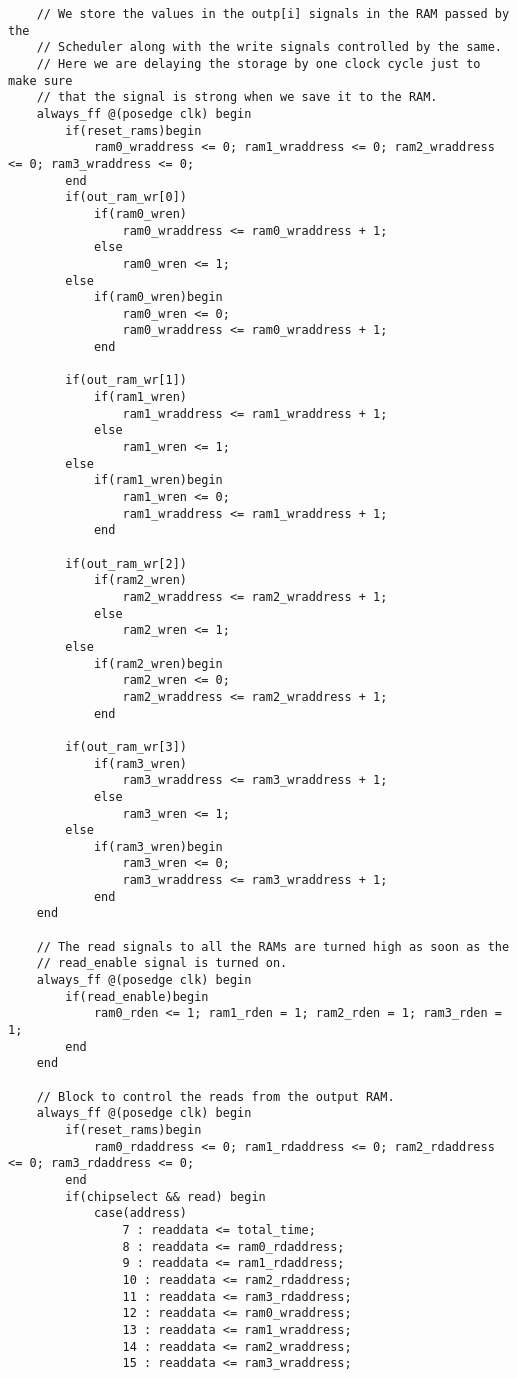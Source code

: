 \documentclass[twoside,12pt,fleqn]{book} %
\begin{document}
\begin{lstlisting}
    // We store the values in the outp[i] signals in the RAM passed by the 
    // Scheduler along with the write signals controlled by the same.
    // Here we are delaying the storage by one clock cycle just to make sure
    // that the signal is strong when we save it to the RAM.
    always_ff @(posedge clk) begin
		if(reset_rams)begin
			ram0_wraddress <= 0; ram1_wraddress <= 0; ram2_wraddress <= 0; ram3_wraddress <= 0;
		end
        if(out_ram_wr[0])
            if(ram0_wren)
                ram0_wraddress <= ram0_wraddress + 1;
            else
                ram0_wren <= 1;
        else
            if(ram0_wren)begin
                ram0_wren <= 0;
                ram0_wraddress <= ram0_wraddress + 1;
            end

        if(out_ram_wr[1])
            if(ram1_wren)
                ram1_wraddress <= ram1_wraddress + 1;
            else
                ram1_wren <= 1;
        else
            if(ram1_wren)begin
                ram1_wren <= 0;
                ram1_wraddress <= ram1_wraddress + 1;
            end

        if(out_ram_wr[2])
            if(ram2_wren)
                ram2_wraddress <= ram2_wraddress + 1;
            else
                ram2_wren <= 1;
        else
            if(ram2_wren)begin
                ram2_wren <= 0;
                ram2_wraddress <= ram2_wraddress + 1;
            end

        if(out_ram_wr[3])
            if(ram3_wren)
                ram3_wraddress <= ram3_wraddress + 1;
            else
                ram3_wren <= 1;
        else
            if(ram3_wren)begin
                ram3_wren <= 0;
                ram3_wraddress <= ram3_wraddress + 1;
            end
    end

    // The read signals to all the RAMs are turned high as soon as the
    // read_enable signal is turned on.
    always_ff @(posedge clk) begin
        if(read_enable)begin
            ram0_rden <= 1; ram1_rden = 1; ram2_rden = 1; ram3_rden = 1;
        end
    end

    // Block to control the reads from the output RAM.
    always_ff @(posedge clk) begin
		if(reset_rams)begin
			ram0_rdaddress <= 0; ram1_rdaddress <= 0; ram2_rdaddress <= 0; ram3_rdaddress <= 0;
		end
        if(chipselect && read) begin
            case(address)
                7 : readdata <= total_time;
                8 : readdata <= ram0_rdaddress;
                9 : readdata <= ram1_rdaddress;
                10 : readdata <= ram2_rdaddress;
                11 : readdata <= ram3_rdaddress;
                12 : readdata <= ram0_wraddress;
                13 : readdata <= ram1_wraddress;
                14 : readdata <= ram2_wraddress;
                15 : readdata <= ram3_wraddress;


\end{lstlisting}
\end{document}

